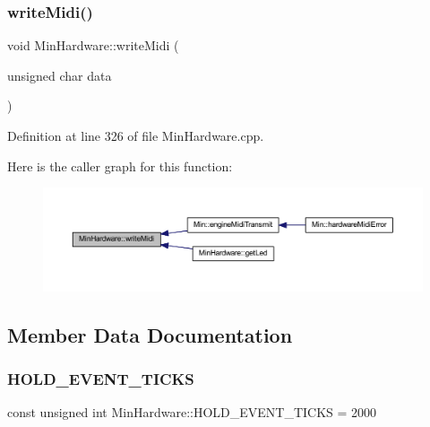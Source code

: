 \subsubsection{\texorpdfstring{write\+Midi()}{writeMidi()}}
{\footnotesize\ttfamily void Min\+Hardware\+::write\+Midi (\begin{DoxyParamCaption}\item[{unsigned char}]{data }\end{DoxyParamCaption})}



Definition at line 326 of file Min\+Hardware.\+cpp.

Here is the caller graph for this function\+:
\nopagebreak
\begin{figure}[H]
\begin{center}
\leavevmode
\includegraphics[width=350pt]{d0/d93/class_min_hardware_a9a29bee58534914c24171d362e78bd2a_icgraph}
\end{center}
\end{figure}


\subsection{Member Data Documentation}
\mbox{\label{class_min_hardware_ae90fda3fb4bdf7ffb4268ae487cd8334}} 
\subsubsection{\texorpdfstring{H\+O\+L\+D\+\_\+\+E\+V\+E\+N\+T\+\_\+\+T\+I\+C\+KS}{HOLD\_EVENT\_TICKS}}
{\footnotesize\ttfamily const unsigned int Min\+Hardware\+::\+H\+O\+L\+D\+\_\+\+E\+V\+E\+N\+T\+\_\+\+T\+I\+C\+KS = 2000\hspace{0.3cm}{\ttfamily [static]}}



